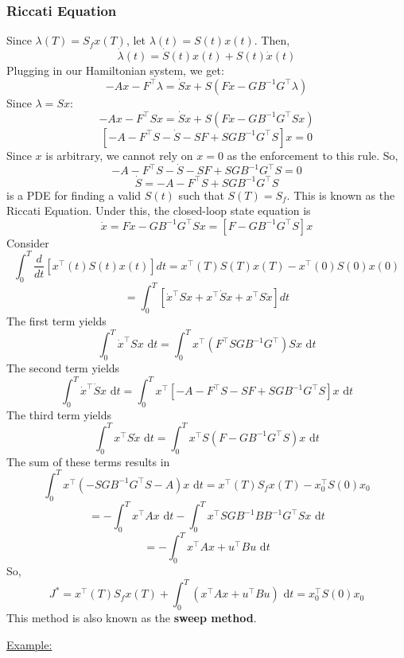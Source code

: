 \documentclass{article}
\begin{document}
\subsubsection{Riccati Equation}

\noindent
Since $\lambda(T) = S_f x(T)$, let $\lambda(t) = S(t)x(t)$. Then,
\[\dot{\lambda}(t) = \dot{S}(t)x(t) + S(t)\dot{x}(t)\]
Plugging in our Hamiltonian system, we get:
\[-Ax - F^\top\lambda = \dot{S}x + S(Fx-GB^{-1}G^\top\lambda)\]
Since $\lambda = Sx$:
\[-Ax - F^\top Sx = \dot{S}x + S(Fx-GB^{-1}G^\top Sx)\]
\[\left[-A-F^\top S-\dot{S}-SF+SGB^{-1}G^\top S\right]x = 0\]
Since $x$ is arbitrary, we cannot rely on $x = 0$ as the enforcement to this rule.
So,
\[-A-F^\top S-\dot{S}-SF+SGB^{-1}G^\top S = 0\]
\[\dot{S} = -A-F^\top S+SGB^{-1}G^\top S\]
is a PDE for finding a valid $S(t)$ such that $S(T) = S_f$.
This is known as the Riccati Equation. Under this, the closed-loop state equation is
\[\dot{x} = Fx - GB^{-1}G^\top Sx = \left[F-GB^{-1}G^\top S\right]x\]
Consider
\[\int_{0}^{T}\frac{d}{dt}\left[x^\top(t)S(t)x(t)\right]dt = x^\top(T)S(T)x(T)-x^\top(0)S(0)x(0)\]
\[= \int_{0}^{T}\left[\dot{x}^\top Sx + x^\top\dot{S}x + x^\top S\dot{x}\right]dt\]
The first term yields
\[\int_{0}^{T}\dot{x}^\top Sx\text{ d}t = \int_{0}^{T}x^\top(F^\top SGB^{-1}G^\top)Sx\text{ d}t\]
The second term yields
\[\int_{0}^{T}\dot{x}^\top \dot{S}x\text{ d}t =
\int_{0}^{T}x^\top[-A-F^\top S-SF+SGB^{-1}G^\top S]x\text{ d}t\]
The third term yields
\[\int_{0}^{T}x^\top S\dot{x}\text{ d}t = \int_{0}^{T}x^\top S(F-GB^{-1}G^\top S)x\text{ d}t\]
The sum of these terms results in
\[\int_{0}^{T}x^\top(-SGB^{-1}G^\top S-A)x\text{ d}t = x^\top(T)S_fx(T)-x_0^\top S(0)x_0\]
\[= -\int_{0}^{T}x^\top Ax\text{ d}t - \int_{0}^{T}x^\top SGB^{-1}BB^{-1}G^\top Sx\text{ d}t\]
\[= -\int_{0}^{T}x^\top Ax + u^\top Bu\text{ d}t\]
So,
\[J^* = x^\top(T)S_fx(T) + \int_{0}^{T}(x^\top Ax + u^\top Bu)\text{ d}t
= x_0^\top S(0)x_0\]
This method is also known as the \textbf{sweep method}.

\noindent
\underline{Example:}
\end{document}
